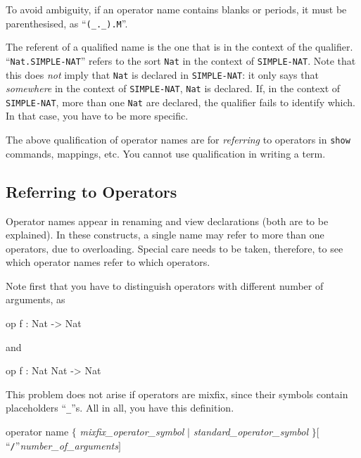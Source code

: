 \documentclass[a4paper]{memoir}
\begin{document}
To avoid ambiguity, if an operator name contains blanks or
periods, it must be parenthesised, as ``\verb|(_._).M|''.

The referent of a qualified name is the one that is in the context
of the qualifier. ``\verb|Nat.SIMPLE-NAT|'' refers to the sort
\verb|Nat| in
the context of \verb|SIMPLE-NAT|. Note that this does {\em not} imply that
\verb|Nat| is declared in \verb|SIMPLE-NAT|: it only says that
{\em somewhere} in the context of \verb|SIMPLE-NAT|, \verb|Nat| is declared.
If, in the context of \verb|SIMPLE-NAT|, more than one \verb|Nat| are
declared, the qualifier fails to identify which. In that case,
you have to be more specific.

\begin{warning}
  The above qualification of operator names are for {\em referring} to
  operators in \verb|show| commands, mappings, etc.
  You cannot use qualification in writing a term.
\end{warning}

\subsection{Referring to Operators}\label{sec:p2-operator-reference}

Operator names appear in renaming and view declarations
(both are to be explained). In these constructs, a single name may
refer to more than one operators, due to overloading.
Special care needs to be taken, therefore, to see which operator
names refer to which operators.

Note first that you have to distinguish operators with different
number of arguments, as
\begin{vvtm}
\begin{ccode}
  op f : Nat -> Nat
\end{ccode}
\end{vvtm}
and
\begin{vvtm}
\begin{ccode}
  op f : Nat Nat -> Nat
\end{ccode}
\end{vvtm}
This problem does not arise if operators are mixfix, since their
symbols contain placeholders ``\verb|_|''s. All in all, you have this
definition.

\begin{bsyntax} operator name \Hline
$\{$ \textit{mixfix\_operator\_symbol} $|$ \textit{standard\_operator\_symbol} $\}[$``\texttt{/}''\textit{number\_of\_arguments}$]$
\end{bsyntax}
\end{document}
